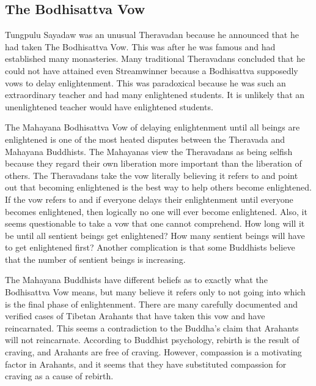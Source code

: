 \documentclass[a5paper,10pt,english]{book}
\begin{document}
\subsection{The Bodhisattva Vow}
\label{\detokenize{saints:the-bodhisattva-vow}}
\sphinxAtStartPar
Tungpulu Sayadaw was an unusual Theravadan because he announced that he
had taken The Bodhisattva Vow. This was after he was famous and had
established many monasteries. Many traditional Theravadans concluded
that he could not have attained even Stream\sphinxhyphen{}winner because a Bodhisattva
supposedly vows to delay enlightenment. This was paradoxical because he
was such an extraordinary teacher and had many enlightened students. It
is unlikely that an unenlightened teacher would have enlightened
students.

\sphinxAtStartPar
The Mahayana Bodhisattva Vow of delaying enlightenment until all beings
are enlightened is one of the most heated disputes between the Theravada
and Mahayana Buddhists. The Mahayanas view the Theravadans as being
selfish because they regard their own liberation more important than the
liberation of others. The Theravadans take the vow literally believing
it refers to  and point out that becoming enlightened
is the best way to help others become enlightened. If the vow refers to
 and if everyone delays their enlightenment until
everyone becomes enlightened, then logically no one will ever become
enlightened. Also, it seems questionable to take a vow that one cannot
comprehend. How long will it be until all sentient beings get
enlightened? How many sentient beings will have to get enlightened
first? Another complication is that some Buddhists believe that the
number of sentient beings is increasing.

\sphinxAtStartPar
The Mahayana Buddhists have different beliefs as to exactly what the
Bodhisattva Vow means, but many believe it refers only to not going into
 which is the final phase of enlightenment. There are
many carefully documented and verified cases of Tibetan Arahants that
have taken this vow and have reincarnated. This seems a contradiction to
the Buddha’s claim that Arahants will not reincarnate. According to
Buddhist psychology, rebirth is the result of craving, and Arahants are
free of craving. However, compassion is a motivating factor in Arahants,
and it seems that they have substituted compassion for craving as a
cause of rebirth.
\end{document}
